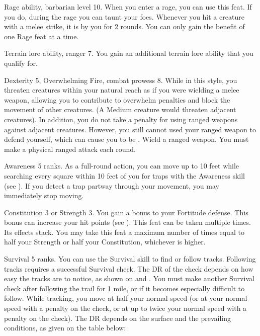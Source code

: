 \featpre Rage ability, barbarian level 10.
\featben When you enter a rage, you can use this feat. If you do, during the rage you can taunt your foes.
Whenever you hit a creature with a melee strike, it is \taunted by you for 2 rounds.
 You can only gain the benefit of one Rage feat at a time.

\featpre Terrain lore ability, ranger 7.
\featben You gain an additional terrain lore ability that you qualify for.

\featpres Dexterity 5, Overwhelming Fire, combat prowess 8.
\featben While in this style, you threaten creatures within your natural reach as if you were wielding a melee weapon, allowing you to contribute to overwhelm penalties and block the movement of other creatures.
(A Medium creature would threaten adjacent creatures).
In addition, you do not take a  penalty for using ranged weapons against adjacent creatures.
However, you still cannot used your ranged weapon to defend yourself, which can cause you to be .
\stylereq Wield a ranged weapon.
You must make a physical ranged attack each round.

\featpre Awareness 5 ranks.
\featben As a full-round action, you can move up to 10 feet while searching every square within 10 feet of you for traps with the Awareness skill (see ).
If you detect a trap partway through your movement, you may immediately stop moving.

\featpre Constitution 3 or Strength 3.
\featben You gain a  bonus to your Fortitude defense.
This bonus can increase your hit points (see ).
 This feat can be taken multiple times. Its effects stack.
You may take this feat a maximum number of times equal to half your Strength or half your Constitution, whichever is higher.

\featpre Survival 5 ranks.
\featben You can use the Survival skill to find or follow tracks.
Following tracks requires a successful Survival check.
The DR of the check depends on how easy the tracks are to notice, as shown on  and .
You must make another Survival check after following the trail for 1 mile, or if it becomes especially difficult to follow.
While tracking, you move at half your normal speed (or at your normal speed with a  penalty on the check, or at up to twice your normal speed with a  penalty on the check).
The DR depends on the surface and the prevailing conditions, as given on the table below:

